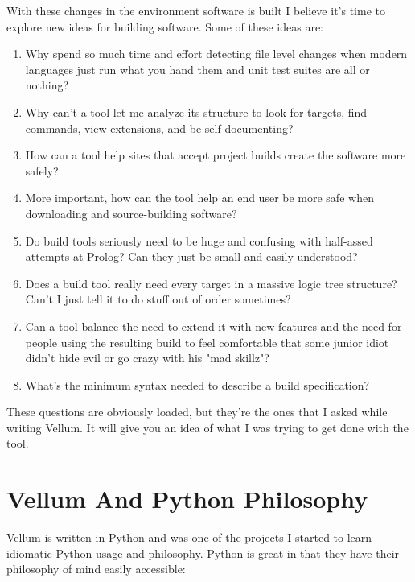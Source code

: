 With these changes in the environment software is built I believe it's time to
explore new ideas for building software.  Some of these ideas are:

\begin{enumerate}
\item Why spend so much time and effort detecting file level changes when modern
languages just run what you hand them and unit test suites are all or nothing?
\item Why can't a tool let me analyze its structure to look for targets, find
commands, view extensions, and be self-documenting?
\item How can a tool help sites that accept project builds create the software
more safely?
\item More important, how can the tool help an end user be more safe when
downloading and source-building software?
\item Do build tools seriously need to be huge and confusing with half-assed
attempts at Prolog?  Can they just be small and easily understood?
\item Does a build tool really need every target in a massive logic tree structure?
Can't I just tell it to do stuff out of order sometimes?
\item Can a tool balance the need to extend it with new features and the need
for people using the resulting build to feel comfortable that some junior idiot
didn't hide evil or go crazy with his "mad skillz"?
\item What's the minimum syntax needed to describe a build specification?
\end{enumerate}

These questions are obviously loaded, but they're the ones that I asked while
writing Vellum.  It will give you an idea of what I was trying to get done with
the tool.




\section{Vellum And Python Philosophy}

Vellum is written in Python and was one of the projects I started to learn
idiomatic Python usage and philosophy.  Python is great in that they have their
philosophy of mind easily accessible:

